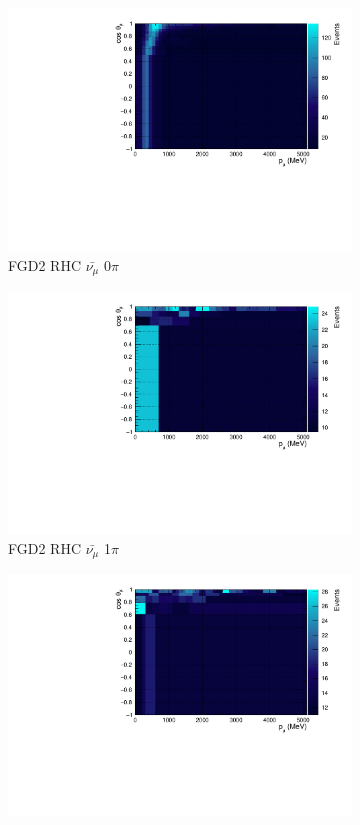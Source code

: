\begin{figure}[!htbp]
\begin{subfigure}{.32\textwidth}
  \includegraphics[width=0.95\linewidth]{figs/TH2PolyNom_MC_FGD2_anti-numuCC_0pi}
  \caption{FGD2 RHC $\bar{\nu_{\mu}}$ 0$\pi$}
  \label{fig:th2polynomFGD2_anti-numuCC_0pi}
\end{subfigure}
\begin{subfigure}{.32\textwidth}
  \centering
  \includegraphics[width=0.95\linewidth]{figs/TH2PolyNom_MC_FGD2_anti-numuCC_1pi}
  \caption{FGD2 RHC $\bar{\nu_{\mu}}$ 1$\pi$}
  \label{fig:th2polyth2polynomFGD2_anti-numuCC_1pi}
\end{subfigure}
\begin{subfigure}{.32\textwidth}
  \centering
  \includegraphics[width=0.95\linewidth]{figs/TH2PolyNom_MC_FGD2_anti-numuCC_other}

\end{subfigure}
\end{figure}
